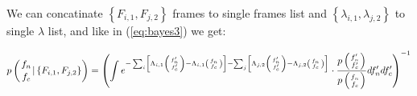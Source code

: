 \documentclass{article}
\begin{document}
We can concatinate $\left\{F_{i,1}, F_{j,2}\right\}$ frames to single frames list and
$\left\{ \lambda_{i,1}, \lambda_{j,2} \right\}$ to single $\lambda$ list, and like in (\ref{eq:bayes3}) we get:

\begin{eqnarray}
p\left({f_n \atop f_c} | \left\{ F_{i,1}, F_{j,2} \right\}\right) =
\left( \int e^{
    -\sum_i \left[\Lambda_{i,1}\left({f'_n \atop f'_c}\right) - \Lambda_{i,1}\left({f_n \atop f_c}\right) \right]
    -\sum_j \left[\Lambda_{j,2}\left({f'_n \atop f'_c}\right) - \Lambda_{j,2}\left({f_n \atop f_c}\right) \right]}
\cdot \frac{p\left({f'_n \atop f'_c}\right)}{p\left({f_n \atop f_c}\right)} df'_n df'_c \right)^{-1}
\end{eqnarray}
\end{document}
